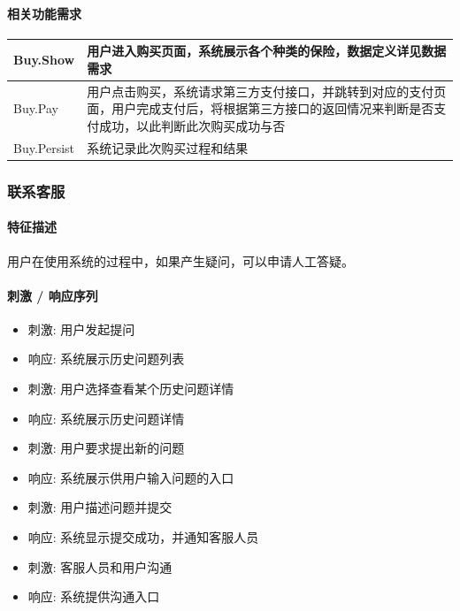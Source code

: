 \documentclass[a4paper]{ctexart}
\begin{document}
\paragraph{相关功能需求}

\begin{center}
  \begin{tabular}{p{6cm}|p{8cm}}
    \toprule
    Buy.Show & 用户进入购买页面，系统展示各个种类的保险，数据定义详见数据需求 \\
    \midrule
    Buy.Pay  & 用户点击购买，系统请求第三方支付接口，并跳转到对应的支付页面，用户完成支付后，将根据第三方接口的返回情况来判断是否支付成功，以此判断此次购买成功与否                                      \\
    \midrule
    Buy.Persist   &  系统记录此次购买过程和结果            \\
    \bottomrule
  \end{tabular}
\end{center}

\subsubsection{联系客服}

\paragraph{特征描述}

用户在使用系统的过程中，如果产生疑问，可以申请人工答疑。

\paragraph{刺激 / 响应序列}

\begin{itemize}
  \item 刺激: 用户发起提问
  \item 响应: 系统展示历史问题列表
  \item 刺激: 用户选择查看某个历史问题详情
  \item 响应: 系统展示历史问题详情
  \item 刺激: 用户要求提出新的问题
  \item 响应: 系统展示供用户输入问题的入口
  \item 刺激: 用户描述问题并提交
  \item 响应: 系统显示提交成功，并通知客服人员
  \item 刺激: 客服人员和用户沟通
  \item 响应: 系统提供沟通入口
\end{itemize}
\end{document}
